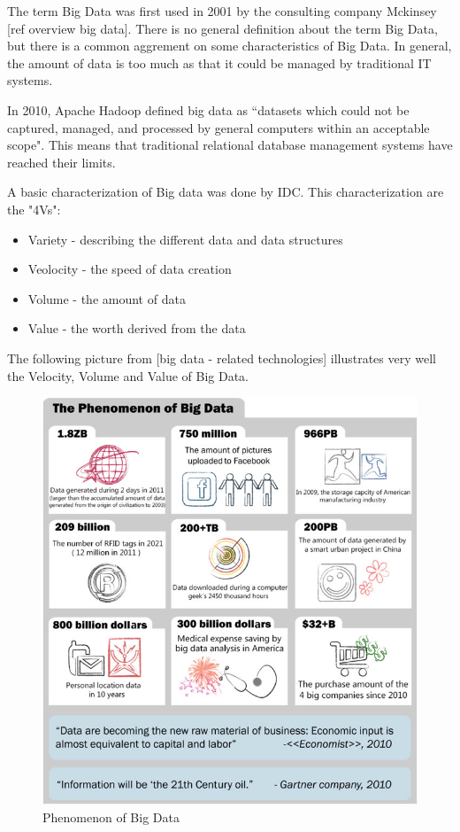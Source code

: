 \documentclass{acm_proc_article-sp}
\begin{document}
The term Big Data was first used in 2001 by the consulting company Mckinsey [ref overview big data]. There is no general definition about the term Big Data, but there is a common aggrement on some characteristics of Big Data. In general, the amount of data is too much as that it could be managed by traditional IT systems.

In 2010, Apache Hadoop defined big data as “datasets which could not be
captured, managed, and processed by general computers within an acceptable
scope". This means that traditional relational database management systems have reached their limits.

A basic characterization of Big data was done by IDC. This characterization are the "4Vs":

\begin{itemize}
	\item Variety - describing the different data and data structures
	\item Veolocity - the speed of data creation
	\item Volume - the amount of data
	\item Value - the worth derived from the data
\end{itemize}

The following picture from [big data - related technologies] illustrates very well the Velocity, Volume and Value of Big Data.

\begin{figure}[hbtp]
	\centering
	\includegraphics[scale=0.5]{big_data.png}
	\caption{Phenomenon of Big Data}
\end{figure}
\end{document}
